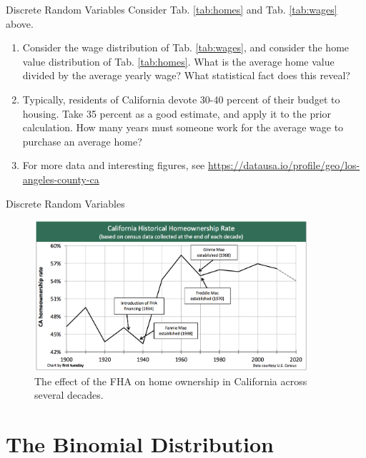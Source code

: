 \documentclass{beamer}
\begin{document}
\begin{frame}{Discrete Random Variables}
\small
Consider Tab. \ref{tab:homes} and Tab. \ref{tab:wages} above.
\begin{enumerate}
\item Consider the wage distribution of Tab. \ref{tab:wages}, and consider the home value distribution of Tab. \ref{tab:homes}.  What is the average home value divided by the average yearly wage?  What statistical fact does this reveal?
\item Typically, residents of California devote 30-40 percent of their budget to housing.  Take 35 percent as a good estimate, and apply it to the prior calculation.  How many years must someone work for the average wage to purchase an average home?
\item For more data and interesting figures, see \url{https://datausa.io/profile/geo/los-angeles-county-ca}
\end{enumerate}
\end{frame}

\begin{frame}{Discrete Random Variables}
\begin{figure}
\centering
\includegraphics[width=0.9\textwidth]{figures/homes.png}
\caption{\label{fig:homes2} The effect of the FHA on home ownership in California across several decades.}
\end{figure}
\end{frame}

\section{The Binomial Distribution}
\end{document}
